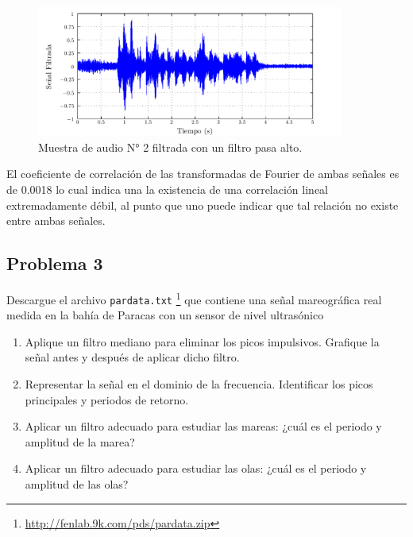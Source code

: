 \documentclass[a4paper,12pt,final]{article}
\begin{document}
      \begin{figure}[H]
        \begin{center}
          \caption{Muestra de audio N° 2 filtrada con un filtro pasa alto.}
          \label{p2f6}
          \vspace{-1em}
          \includegraphics[width=0.9\textwidth]{./laboratorio_5/problema02_sample02_highpass_filtered_signal.pdf}
        \end{center}
      \end{figure}
      \vfill

      \newpage
      \noindent El coeficiente de correlación de las transformadas de Fourier
      de ambas señales es de 0.0018 lo cual indica una la existencia de
      una correlación lineal extremadamente débil, al punto que uno puede
      indicar que tal relación no existe entre ambas señales.

  \newpage
  \subsection*{Problema 3}
    \noindent Descargue el archivo \texttt{pardata.txt}
      \footnote{\url{http://fenlab.9k.com/pds/pardata.zip}} que contiene una
      señal mareográfica real medida en la bahía de Paracas con un sensor
      de nivel ultrasónico

      \begin{enumerate}[label=\alph*)]
        \item Aplique un filtro mediano para eliminar los picos impulsivos. Grafique la señal antes y después de aplicar dicho filtro.
        \item Representar la señal en el dominio de la frecuencia. Identificar los picos principales y periodos de retorno.
        \item Aplicar un filtro adecuado para estudiar las mareas: ¿cuál es el periodo y amplitud de la marea?
        \item Aplicar un filtro adecuado para estudiar las olas: ¿cuál es el periodo y amplitud de las olas?
      \end{enumerate}
\end{document}
